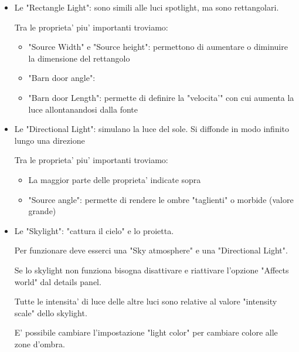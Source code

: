 \begin{itemize}
                \item Le "Rectangle Light": sono simili alle luci spotlight, ma sono rettangolari.

                    Tra le proprieta' piu' importanti troviamo:
                    \begin{itemize}
                        \item "Source Width" e "Source height": permettono di aumentare o diminuire la dimensione del rettangolo
                        \item "Barn door angle":
                        \item "Barn door Length": permette di definire la "velocita'" con cui aumenta la luce allontanandosi dalla fonte
                    \end{itemize}

                \item Le "Directional Light": simulano la luce del sole. Si diffonde in modo infinito lungo una direzione

                    Tra le proprieta' piu' importanti troviamo:
                    \begin{itemize}
                        \item La maggior parte delle proprieta' indicate sopra
                        \item "Source angle": permette di rendere le ombre "taglienti" o morbide (valore grande)
                    \end{itemize}

                \item Le "Skylight": "cattura il cielo" e lo proietta.

                    Per funzionare deve esserci una "Sky atmosphere" e una "Directional Light".

                    \begin{notebox}
                        Se lo skylight non funziona bisogna disattivare e riattivare l'opzione "Affects world" dal details panel.
                    \end{notebox}

                    Tutte le intensita' di luce delle altre luci sono relative al valore "intensity scale" dello skylight.

                    E' possibile cambiare l'impostazione "light color" per cambiare colore alle zone d'ombra.

            \end{itemize}


